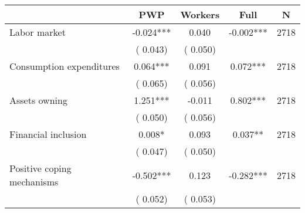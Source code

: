 
\begin{tabular}{l*{4}{c}}\hline&\multicolumn{1}{c}{PWP}&\multicolumn{1}{c}{Workers}&\multicolumn{1}{c}{Full}&\multicolumn{1}{c}{N} \\ \hline

 Labor market &             -0.024*** &         0.040 &          -0.002*** & 2718                       \\  
                 &        (       0.043)                   &        (       0.050)                        &                                                             &                                                      \\      

 Consumption expenditures &              0.064*** &         0.091 &           0.072*** & 2718                       \\  
                 &        (       0.065)                   &        (       0.056)                        &                                                             &                                                      \\      

 Assets owning &              1.251*** &        -0.011 &           0.802*** & 2718                       \\  
                 &        (       0.050)                   &        (       0.056)                        &                                                             &                                                      \\      

 Financial inclusion &              0.008* &         0.093 &           0.037** & 2718                       \\  
                 &        (       0.047)                   &        (       0.050)                        &                                                             &                                                      \\      

 Positive coping mechanisms &             -0.502*** &         0.123 &          -0.282*** & 2718                       \\  
                 &        (       0.052)                   &        (       0.053)                        &                                                             &                                                      \\      


\end{tabular}
